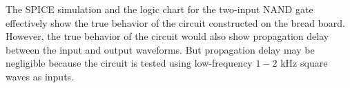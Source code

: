
The SPICE simulation and the logic chart for the two-input NAND gate effectively show the true behavior of the circuit constructed on the bread board.
However, the true behavior of the circuit would also show propagation delay between the input and output waveforms.
But propagation delay may be negligible because the circuit is tested using low-frequency $1 -2$ \si{\kilo\hertz} square waves as inputs.
